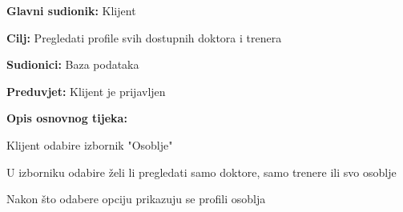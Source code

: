 					\noindent {}
					\begin{packed_item}
	
						\item \textbf{Glavni sudionik:} Klijent
						\item  \textbf{Cilj:} Pregledati profile svih dostupnih doktora i trenera
						\item  \textbf{Sudionici:} Baza podataka
						\item  \textbf{Preduvjet:} Klijent je prijavljen
						\item  \textbf{Opis osnovnog tijeka:}
						
						\item[] \begin{packed_enum}
	
							\item Klijent odabire izbornik "Osoblje"
							\item U izborniku odabire želi li pregledati samo doktore, samo trenere ili svo osoblje
							\item Nakon što odabere opciju prikazuju se profili osoblja
						\end{packed_enum}
						
					\end{packed_item}
				
